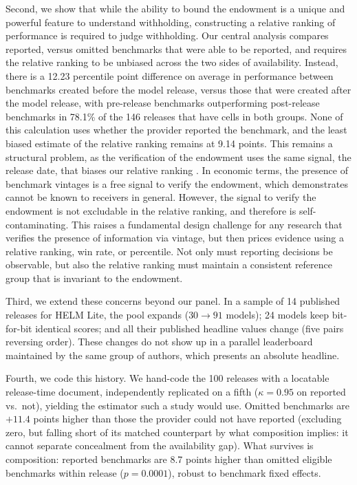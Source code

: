 Second, we show that while the ability to bound the endowment is a unique and powerful feature to understand withholding, constructing a relative ranking of performance is required to judge withholding. Our central analysis compares reported, versus omitted benchmarks that were able to be reported, and requires the relative ranking to be unbiased across the two sides of availability. Instead, there is a 12.23 percentile point difference on average in performance between benchmarks created before the model release, versus those that were created after the model release, with pre-release benchmarks outperforming post-release benchmarks in 78.1\% of the 146 releases that have cells in both groups. None of this calculation uses whether the provider reported the benchmark, and the least biased estimate of the relative ranking remains at 9.14 points. This remains a structural problem, as the verification of the endowment uses the same signal, the release date, that biases our relative ranking \citep{heckman1979}. In economic terms, the presence of benchmark vintages is a free signal to verify the endowment, which \citet{dye1985} demonstrates cannot be known to receivers in general. However, the signal to verify the endowment is not excludable in the relative ranking, and therefore is self-contaminating. This raises a fundamental design challenge for any research that verifies the presence of information via vintage, but then prices evidence using a relative ranking, win rate, or percentile. Not only must reporting decisions be observable, but also the relative ranking must maintain a consistent reference group that is invariant to the endowment.

Third, we extend these concerns beyond our panel. In a sample of 14 published releases for HELM Lite, the pool expands ($30 \to 91$ models); 24 models keep bit-for-bit identical scores; and all their published headline values change (five pairs reversing order). These changes do not show up in a parallel leaderboard maintained by the same group of authors, which presents an absolute headline.

Fourth, we code this history. We hand-code the 100 releases with a locatable release-time document, independently replicated on a fifth ($\kappa = 0.95$ on reported vs.\ not), yielding the estimator such a study would use. Omitted benchmarks are $+11.4$ points higher than those the provider could not have reported (excluding zero, but falling short of its matched counterpart by what composition implies: it cannot separate concealment from the availability gap). What survives is composition: reported benchmarks are 8.7 points higher than omitted eligible benchmarks within release ($p = 0.0001$), robust to benchmark fixed effects.

